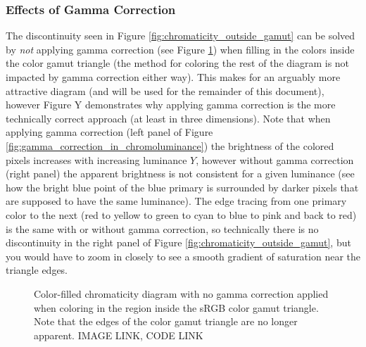 \documentclass[twocolumn]{article}
\newif\ifinvert
\begin{document}
\subsubsection{Effects of Gamma Correction}
The discontinuity seen in Figure \ref{fig:chromaticity_outside_gamut} can be solved by \textit{not} applying gamma correction (see Figure \ref{fig:chromaticity_without_gamma_correction}) when filling in the colors inside the color gamut triangle (the method for coloring the rest of the diagram is not impacted by gamma correction either way).  This makes for an arguably more attractive diagram (and will be used for the remainder of this document), however Figure Y demonstrates why applying gamma correction is the more technically correct approach (at least in three dimensions).  Note that when applying gamma correction (left panel of Figure \ref{fig:gamma_correction_in_chromoluminance}) the brightness of the colored pixels increases with increasing luminance $Y$, however without gamma correction (right panel) the apparent brightness is not consistent for a given luminance (see how the bright blue point of the blue primary is surrounded by darker pixels that are supposed to have the same luminance).  The edge tracing from one primary color to the next (red to yellow to green to cyan to blue to pink and back to red) is the same with or without gamma correction, so technically there is no discontinuity in the right panel of Figure \ref{fig:chromaticity_outside_gamut}, but you would have to zoom in closely to see a smooth gradient of saturation near the triangle edges.
\begin{figure}[h]
    \ifinvert
        
    \else
        
    \fi
    \caption{Color-filled chromaticity diagram with no gamma correction applied when coloring in the region inside the sRGB color gamut triangle.  Note that the edges of the color gamut triangle are no longer apparent.  IMAGE LINK, CODE LINK}\label{fig:chromaticity_without_gamma_correction}
\end{figure}
\begin{figure*}[h]
    \ifinvert
        
    \else
        
    \fi
    \caption{Saturated surfaces transformed into $(x,y,Y)$ chromoluminance space with (left panel) and without (right panel) gamma correction applied.  With gamma correction the apparent brightness of pixels increases with luminance $Y$ uniformly around the color gamut volume.  Without gamma correction the sides generally appear darker, yet the brightness is still high near the primary colors creating variation in apparent brightness around what should be a path of constant luminance.  IMAGE LINK, CODE LINK}\label{fig:gamma_correction_in_chromoluminance}
\end{figure*}
\end{document}
